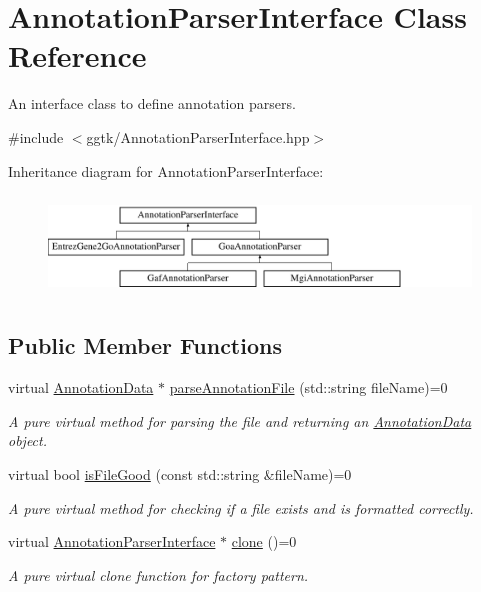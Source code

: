 \hypertarget{classAnnotationParserInterface}{}\section{Annotation\+Parser\+Interface Class Reference}
\label{classAnnotationParserInterface}


An interface class to define annotation parsers.  




{\ttfamily \#include $<$ggtk/\+Annotation\+Parser\+Interface.\+hpp$>$}

Inheritance diagram for Annotation\+Parser\+Interface\+:\begin{figure}[H]
\begin{center}
\leavevmode
\includegraphics[height=2.705314cm]{classAnnotationParserInterface}
\end{center}
\end{figure}
\subsection*{Public Member Functions}
\begin{DoxyCompactItemize}
\item 
virtual \hyperlink{classAnnotationData}{Annotation\+Data} $\ast$ \hyperlink{classAnnotationParserInterface_a1d5cfb902f088a9cf96fdc6b1e5529ab}{parse\+Annotation\+File} (std\+::string file\+Name)=0
\begin{DoxyCompactList}\small\item\em A pure virtual method for parsing the file and returning an \hyperlink{classAnnotationData}{Annotation\+Data} object. \end{DoxyCompactList}\item 
virtual bool \hyperlink{classAnnotationParserInterface_a5848b37ca77d78213c87cc5aefebf030}{is\+File\+Good} (const std\+::string \&file\+Name)=0
\begin{DoxyCompactList}\small\item\em A pure virtual method for checking if a file exists and is formatted correctly. \end{DoxyCompactList}\item 
virtual \hyperlink{classAnnotationParserInterface}{Annotation\+Parser\+Interface} $\ast$ \hyperlink{classAnnotationParserInterface_a966edeb9aaaa5e94f4c1436afc731a24}{clone} ()=0
\begin{DoxyCompactList}\small\item\em A pure virtual clone function for factory pattern. \end{DoxyCompactList}\end{DoxyCompactItemize}


